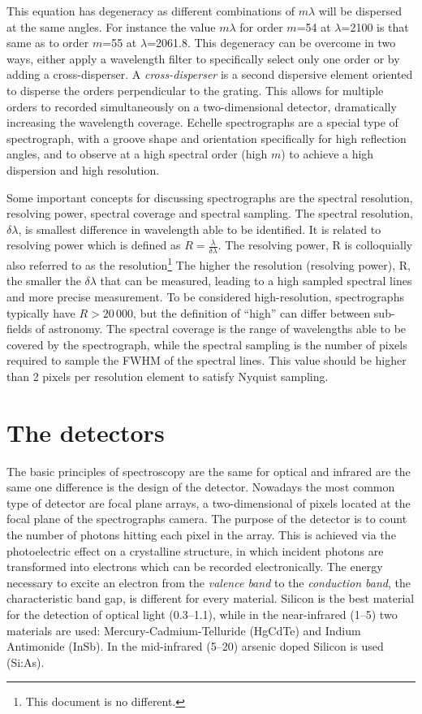 This equation has degeneracy as different combinations of $m \lambda$ will be dispersed at the same angles.
For instance the value $m \lambda$ for order $m$=54 at $\lambda$=2100\nm{} is that same as to order $m$=55 at $\lambda$=2061.8\nm{}.
This degeneracy can be overcome in two ways, either apply a wavelength filter to specifically select only one order or by adding a cross-disperser.
A \emph{cross-disperser} is a second dispersive element oriented to disperse the orders perpendicular to the grating.
This allows for multiple orders to recorded simultaneously on a two-dimensional detector, dramatically increasing the wavelength coverage.
Echelle spectrographs are a special type of spectrograph, with a groove shape and orientation specifically for high reflection angles, and to observe at a high spectral order (high $m$) to achieve a high dispersion and high resolution.

Some important concepts for discussing spectrographs are the spectral resolution, resolving power, spectral coverage and spectral sampling.
The spectral resolution, \(\delta \lambda\), is smallest difference in wavelength able to be identified.
It is related to resolving power which is defined as \(R=\frac{\lambda}{\delta\lambda}\).
The resolving power, R is colloquially also referred to as the resolution\footnote{This document is no different.} The higher the resolution (resolving power), R, the smaller the \(\delta\lambda\) that can be measured, leading to a high sampled spectral lines and more precise measurement.
To be considered high-resolution, spectrographs typically have \(R>20\,000\), but the definition of ``high'' can differ between sub-fields of astronomy.
The spectral coverage is the range of wavelengths able to be covered by the spectrograph, while the spectral sampling is the number of pixels required to sample the {FWHM} of the spectral lines.
This value should be higher than 2 pixels per resolution element to satisfy Nyquist sampling.

\section{The detectors}
\label{subsec:nir_detectors}
The basic principles of spectroscopy are the same for optical and infrared are the same one difference is the design of the detector.
Nowadays the most common type of detector are focal plane arrays, a two-dimensional of pixels located at the focal plane of the spectrographs camera.
The purpose of the detector is to count the number of photons hitting each pixel in the array.
This is achieved via the photoelectric effect on a crystalline structure, in which incident photons are transformed into electrons which can be recorded electronically.
The energy necessary to excite an electron from the \emph{valence band} to the \emph{conduction band}, the characteristic band gap, is different for every material.
Silicon is the best material for the detection of optical light (0.3--1.1\um), while in the near-infrared (1--5\um) two materials are used: {Mercury-Cadmium-Telluride} (\si{HgCdTe}) and {Indium Antimonide} (\si{InSb}).
In the mid-infrared (5--20\um) arsenic doped Silicon is used (\si{Si}:\si{As}).

